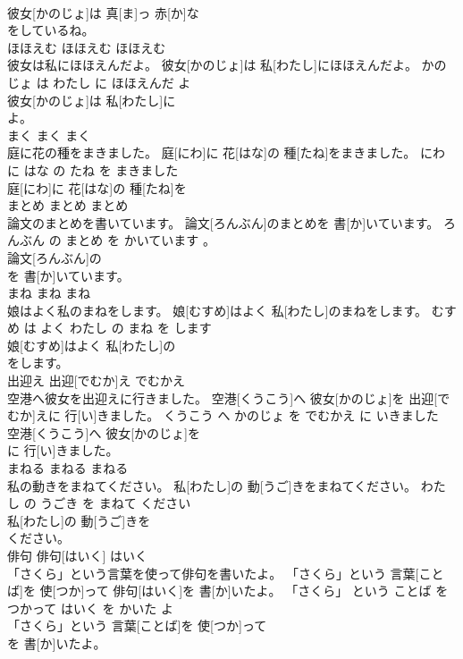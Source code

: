 \documentclass[8pt]{extreport}
\begin{document}
\begin{CJK}{UTF8}{min}
\\	彼女[かのじょ]は 真[ま]っ 赤[か]な
\\	をしているね。			
\\	ほほえむ	ほほえむ	ほほえむ	
\\	彼女は私にほほえんだよ。	彼女[かのじょ]は 私[わたし]にほほえんだよ。	かのじょ は わたし に ほほえんだ よ	
\\	彼女[かのじょ]は 私[わたし]に
\\	よ。			
\\	まく	まく	まく	
\\	庭に花の種をまきました。	庭[にわ]に 花[はな]の 種[たね]をまきました。	にわ に はな の たね を まきました	
\\	庭[にわ]に 花[はな]の 種[たね]を
\\	まとめ	まとめ	まとめ	
\\	論文のまとめを書いています。	論文[ろんぶん]のまとめを 書[か]いています。	ろんぶん の まとめ を かいています 。	
\\	論文[ろんぶん]の
\\	を 書[か]いています。			
\\	まね	まね	まね	
\\	娘はよく私のまねをします。	娘[むすめ]はよく 私[わたし]のまねをします。	むすめ は よく わたし の まね を します	
\\	娘[むすめ]はよく 私[わたし]の
\\	をします。			
\\	出迎え	出迎[でむか]え	でむかえ	
\\	空港へ彼女を出迎えに行きました。	空港[くうこう]へ 彼女[かのじょ]を 出迎[でむか]えに 行[い]きました。	くうこう へ かのじょ を でむかえ に いきました	
\\	空港[くうこう]へ 彼女[かのじょ]を
\\	に 行[い]きました。			
\\	まねる	まねる	まねる	
\\	私の動きをまねてください。	私[わたし]の 動[うご]きをまねてください。	わたし の うごき を まねて ください	
\\	私[わたし]の 動[うご]きを
\\	ください。			
\\	俳句	俳句[はいく]	はいく	
\\	「さくら」という言葉を使って俳句を書いたよ。	「さくら」という 言葉[ことば]を 使[つか]って 俳句[はいく]を 書[か]いたよ。	「さくら」 という ことば を つかって はいく を かいた よ	
\\	「さくら」という 言葉[ことば]を 使[つか]って
\\	を 書[か]いたよ。			

\end{CJK}
\end{document}
